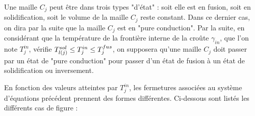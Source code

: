 Une maille $C_j$ peut être dans trois types "d'état" : soit elle est en fusion, soit en solidification, soit le volume de la maille $C_j$ reste constant. Dans ce dernier cas, on dira par la suite que la maille $C_j$ est en "pure conduction". Par la suite, en considérant que la température de la frontière interne de la croûte $\gamma_{in}$, que l'on note $T_j^{in}$, vérifie $\temperature[sol]{l(j)}\leq T_j^{in}\leq T_j^{fus}$, on supposera qu'une maille $C_j$ doit passer par un état de "pure conduction" pour passer d'un état de fusion à un état de solidification ou inversement.

En fonction des valeurs atteintes par $T_j^{in}$, les fermetures associées au système d'équations précédent prennent des formes différentes. Ci-dessous sont listés les différents cas de figure :\\

